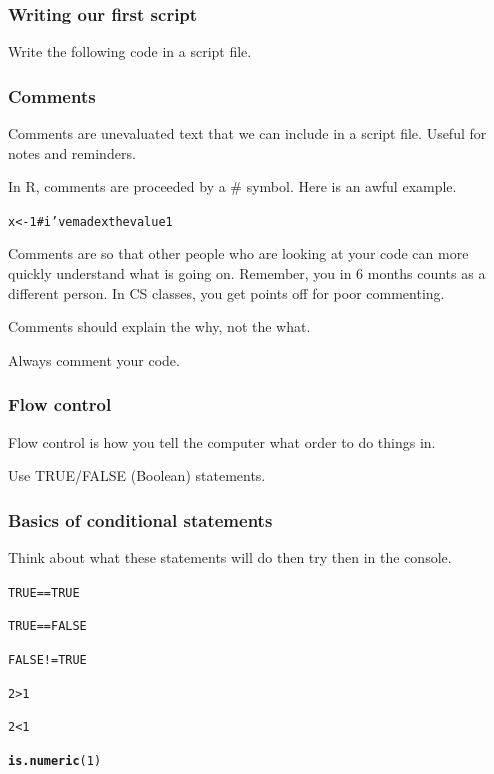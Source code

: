\documentclass{beamer}\usepackage{graphicx, color}
\makeatletter
\newcommand{\hlfunctioncall}[1]{\textcolor[rgb]{0.501960784313725,0,0.329411764705882}{\textbf{#1}}}%
\newcommand{\hlcomment}[1]{\textcolor[rgb]{0.180392156862745,0.6,0.341176470588235}{#1}}%
\newenvironment{kframe}{%
 \def\at@end@of@kframe{}%
 \ifinner\ifhmode%
  \def\at@end@of@kframe{\end{minipage}}%
  \begin{minipage}{\columnwidth}%
 \fi\fi%
 \def\FrameCommand##1{\hskip\@totalleftmargin \hskip-\fboxsep
 \colorbox{shadecolor}{##1}\hskip-\fboxsep
     \hskip-\linewidth \hskip-\@totalleftmargin \hskip\columnwidth}%
 \MakeFramed {\advance\hsize-\width
   \@totalleftmargin\z@ \linewidth\hsize
   \@setminipage}}%
 {\par\unskip\endMakeFramed%
 \at@end@of@kframe}
\newenvironment{knitrout}{}{} %
\makeatother
\begin{document}
\begin{frame}[fragile]
  \frametitle{Writing our first script}
  Write the following code in a script file.




\end{frame}

\begin{frame}[fragile]
  \frametitle{Comments}

  Comments are unevaluated text that we can include in a script file. Useful for notes and reminders.

  In R, comments are proceeded by a \# symbol. Here is an awful example.

\begin{knitrout}\small
{}\color{fgcolor}\begin{kframe}
\begin{alltt}
x <- 1  \hlcomment{# i've made x the value 1}
\end{alltt}
\end{kframe}
\end{knitrout}


  Comments are so that other people who are looking at your code can more quickly understand what is going on. Remember, you in 6 months counts as a different person. In CS classes, you get points off for poor commenting.

  Comments should explain the why, not the what.
  
  Always comment your code. 

\end{frame}

\begin{frame}
  \frametitle{Flow control}
  Flow control is how you tell the computer what order to do things in.

  Use TRUE/FALSE (Boolean) statements.

\end{frame}

\begin{frame}[fragile]
  \frametitle{Basics of conditional statements}
  Think about what these statements will do then try then in the console.

\begin{knitrout}\small
{}\color{fgcolor}\begin{kframe}
\begin{alltt}
TRUE == TRUE

TRUE == FALSE

FALSE != TRUE

2 > 1

2 < 1

\hlfunctioncall{is.numeric}(1)

\end{alltt}
\end{kframe}
\end{knitrout}


\end{frame}
\end{document}
